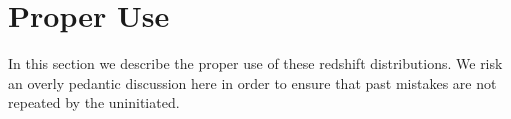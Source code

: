 \documentclass[preprint]{aastex}
\begin{document}

\section{Proper Use} \label{sec:usage}

In this section we describe the proper use of these redshift distributions.
We risk an overly pedantic discussion here in order to ensure that past
mistakes are not repeated by the uninitiated.
\end{document}
